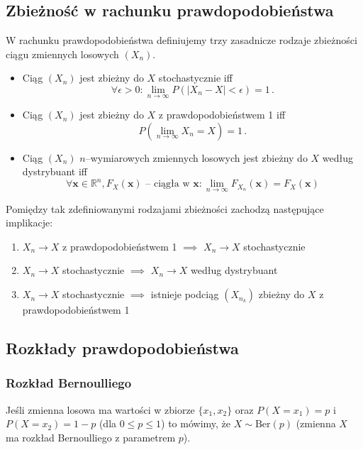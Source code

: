 \documentclass{myclass}
\begin{document}
\subsection{Zbieżność w rachunku prawdopodobieństwa}

W rachunku prawdopodobieństwa definiujemy trzy zasadnicze rodzaje zbieżności ciągu zmiennych
losowych \((X_n)\). 
\begin{itemize}
    \item Ciąg \((X_n)\) jest zbieżny do \(X\) stochastycznie iff
    \begin{equation*}
        \forall \epsilon > 0: \lim_{n\to\infty} P(|X_n - X| < \epsilon) = 1\,.
    \end{equation*}

    \item Ciąg \((X_n)\) jest zbieżny do \(X\) z prawdopodobieństwem 1 iff
    \begin{equation*}
        P\left(\lim_{n\to\infty} X_n = X\right) = 1\,.
    \end{equation*}

    \item Ciąg \((X_n)\) \(n\)--wymiarowych zmiennych losowych jest zbieżny do \(X\) według
    dystrybuant iff
    \begin{equation*}
        \forall \mathbf{x} \in \mathbb{R}^n, F_X(\mathbf{x}) \text{ -- ciągła w \(\mathbf{x}\)}: \lim_{n\to\infty} F_{X_n}(\mathbf{x}) = F_X(\mathbf{x})
    \end{equation*}

\end{itemize}

Pomiędzy tak zdefiniowanymi rodzajami zbieżności zachodzą następujące implikacje:
\begin{enumerate}
    \item \(X_n \to X\) z prawdopodobieństwem 1 \(\implies\) \(X_n \to X\) stochastycznie
    \item \(X_n \to X\) stochastycznie \(\implies\) \(X_n \to X\) według dystrybuant
    \item \(X_n \to X\) stochastycznie \(\implies\) istnieje podciąg \((X_{n_k})\) zbieżny do \(X\)
    z prawdopodobieństwem 1
\end{enumerate}

\subsection{Rozkłady prawdopodobieństwa}
\subsubsection{Rozkład Bernoulliego}
Jeśli zmienna losowa ma wartości w zbiorze \(\{x_1, x_2\}\) oraz \(P(X = x_1) = p\) i \(P(X = x_2) =
1 - p\) (dla \(0\leq p \leq 1\)) to mówimy, że \(X \sim \text{Ber}(p)\) (zmienna \(X\) ma rozkład
Bernoulliego z parametrem \(p\)).
\end{document}

